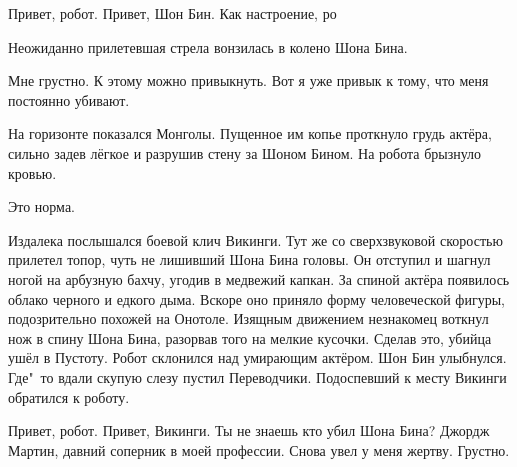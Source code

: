 {\footnotesize \begin{dialog}
\X Привет, робот.
\R Привет, Шон Бин.
\X Как настроение, ро\ldotsq{}
\end{dialog}

\begin{monolog}
Неожиданно прилетевшая стрела вонзилась в колено Шона Бина.
\end{monolog}

\begin{dialog}
\R Мне грустно.
\X К этому можно привыкнуть. Вот я уже привык к тому, что меня постоянно убивают.
\end{dialog}

\begin{monolog}
На горизонте показался Монголы. Пущенное им копье проткнуло грудь актёра, сильно задев лёгкое и разрушив стену за Шоном Бином. На робота брызнуло кровью.
\end{monolog}

\begin{dialog}
\X Это норма.
\end{dialog}

\begin{monolog}
Издалека послышался боевой клич Викинги. Тут же со сверхзвуковой скоростью прилетел топор, чуть не лишивший Шона Бина головы. Он отступил и шагнул ногой на арбузную бахчу, угодив в медвежий капкан. За спиной актёра появилось облако черного и едкого дыма. Вскоре оно приняло форму человеческой фигуры, подозрительно похожей на Онотоле. Изящным движением незнакомец воткнул нож в спину Шона Бина, разорвав того на мелкие кусочки. Сделав это, убийца ушёл в Пустоту. Робот склонился над умирающим актёром. Шон Бин улыбнулся. Где"~то вдали скупую слезу пустил Переводчики. Подоспевший к месту Викинги обратился к роботу.
\end{monolog}

\begin{dialog}
\X Привет, робот.
\R Привет, Викинги. Ты не знаешь кто убил Шона Бина?
\X Джордж Мартин, давний соперник в моей профессии. Снова увел у меня жертву.
\R Грустно.
\end{dialog}}